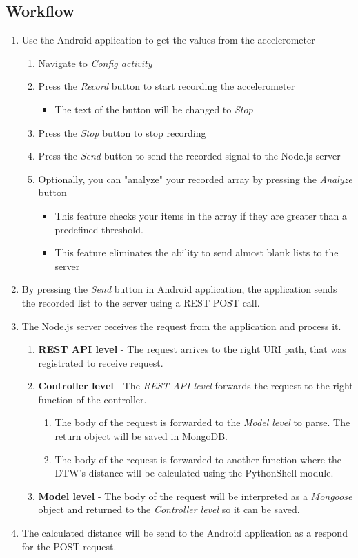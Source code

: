 \documentclass[12pt, a4paper, portrait]{article}
\begin{document}
\subsection{Workflow}
\begin{enumerate}
\item{Use the Android application to get the values from the accelerometer}
\begin{enumerate}
\item{Navigate to \textit{Config activity}}
\item{Press the \textit{Record} button to start recording the accelerometer}
\begin{itemize}
\item{The text of the button will be changed to \textit{Stop}}
\end{itemize}
\item{Press the \textit{Stop} button to stop recording}
\item{Press the \textit{Send} button to send the recorded signal to the Node.js server}
\item{Optionally, you can "analyze" your recorded array by pressing the \textit{Analyze} button}
\begin{itemize}
\item{This feature checks your items in the array if they are greater than a predefined threshold.}
\item{This feature eliminates the ability to send almost blank lists to the server}
\end{itemize}
\end{enumerate}
\item{By pressing the \textit{Send} button in Android application, the application sends the recorded list to the server using a REST POST call.}
\item{The Node.js server receives the request from the application and process it.}
\begin{enumerate}
\item{\textbf{REST API level} - The request arrives to the right URI path, that was registrated to receive request.}
\item{\textbf{Controller level} - The \textit{REST API level} forwards the request to the right function of the controller.}
\begin{enumerate}
\item{The body of the request is forwarded to the \textit{Model level} to parse. The return object will be saved in MongoDB.}
\item{The body of the request is forwarded to another function where the DTW's distance will be calculated using the PythonShell module.}
\end{enumerate}
\item{\textbf{Model level} - The body of the request will be interpreted as a \textit{Mongoose} object and returned to the \textit{Controller level} so it can be saved.}
\end{enumerate}
\item{The calculated distance will be send to the Android application as a respond for the POST request.}
\end{enumerate}
\end{document}
